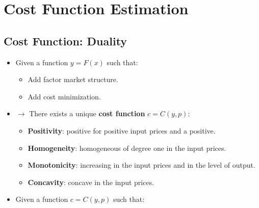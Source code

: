 \documentclass[
]{book}
\providecommand{\tightlist}{%
  \setlength{\itemsep}{0pt}\setlength{\parskip}{0pt}}
\begin{document}
\hypertarget{cost-function-estimation}{%
\section{Cost Function Estimation}\label{cost-function-estimation}}

\hypertarget{cost-function-duality}{%
\subsection{Cost Function: Duality}\label{cost-function-duality}}

\begin{itemize}
\item
  Given a function \(y = F(x)\) such that:

  \begin{itemize}
  \tightlist
  \item
    Add factor market structure.
  \item
    Add cost minimization.
  \end{itemize}
\item
  \(\rightarrow\) There exists a unique \textbf{cost function} \(c = C(y, p)\):

  \begin{itemize}
  \tightlist
  \item
    \textbf{Positivity}: positive for positive input prices and a positive.
  \item
    \textbf{Homogeneity}: homogeneous of degree one in the input prices.
  \item
    \textbf{Monotonicity}: increasing in the input prices and in the level of output.
  \item
    \textbf{Concavity}: concave in the input prices.
  \end{itemize}
\item
  Given a function \(c = C(y, p)\) such that:


\end{itemize}
\end{document}
